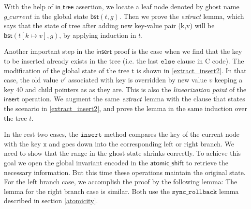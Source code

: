 \documentclass[acmsmall,screen]{acmart}\settopmatter{printfolios=true}
\newcommand{\treerep}{\ensuremath{\mathsf{bst}}}
\begin{document}
With the help of $\mathsf{in\_tree}$ assertion, we locate a leaf node denoted by ghost name $g\_current$ in the global state $\treerep(t,g)$. Then we prove the \emph{extract} lemma, which says that the state of tree after adding new key-value pair (k,v) will be $\treerep(t[k\mapsto v],g)$, by applying induction in $t$. 

Another important step in the $\mathsf{insert}$ proof is the case when we find that the key to be inserted already exists in the tree (i.e. the last $\texttt{else}$ clause in C code). The modification of the global state of the tree t is shown in \ref{extract_insert2}. In that case, the old value $v'$ associated with key is overridden by new value $v$ keeping a key $40$ and child pointers as as they are. This is also the \emph{linearization point} of the $\mathsf{insert}$ operation. We augment the same $\emph{extract}$ lemma with the clause that states the scenario in \ref{extract_insert2}, and prove the lemma in the same induction over the tree $t$.

In the rest two cases, the $\texttt{insert}$ method compares the key
of the current node with the key $\texttt{x}$ and goes down into the
corresponding left or right branch. We need to show that the range in
the ghost state shrinks correctly. To achieve this goal we open the
global invariant encoded in the $\mathsf{atomic\_shift}$ to retrieve
the necessary information. But this time these operations maintain the
original state. For the left branch case, we accomplish the proof by
the following lemma:
The lemma for the right branch case is similar. Both use the
$\texttt{sync\_rollback}$ lemma described in section \ref{atomicity}.
  
\end{document}

